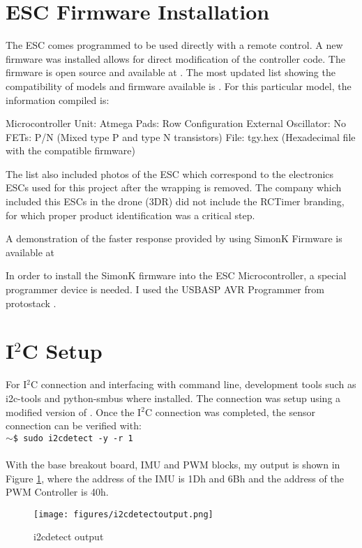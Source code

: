 \documentclass[letterpaper, 12pt]{article}
\newcommand{\shellcmd}[2]{\texttt{\large{#1}\$ {#2}\\}}
\begin{document}
\section{ESC Firmware Installation} \label{sec:simonk}

The ESC comes programmed to be used directly with a remote control. A new firmware was installed allows for direct modification of the controller code. The firmware is open source and available at \cite{simonk}. The most updated list showing the compatibility of models and firmware available is \cite{esc_list}. For this particular model, the information compiled is:

\noindent Microcontroller Unit: Atmega
Pads: Row Configuration
External Oscillator: No
FETs: P/N (Mixed type P and type N transistors)
File: tgy.hex (Hexadecimal file with the compatible firmware)

The list also included photos of the ESC which correspond to the electronics ESCs used for this project after the wrapping is removed. The company which included this ESCs in the drone (3DR) did not include the RCTimer branding, for which proper product identification was a critical step.

A demonstration of the faster response provided by using SimonK Firmware is available at \cite{simonk_demo}

In order to install the SimonK firmware into the ESC Microcontroller, a special programmer device is needed. I used the USBASP AVR Programmer from protostack \cite{avr_prog}.

\section{I$^2$C Setup}

For I$^2$C connection and interfacing with command line, development tools such as i2c-tools and python-smbus where installed. The connection was setup using a modified version of \cite{i2cpython}. Once the I$^2$C connection was completed,  the sensor connection can be verified with:\\

\shellcmd{\bf$\sim$}{sudo i2cdetect -y -r 1}\\

With the base breakout board, IMU and PWM blocks, my output is shown in Figure \ref{fig:i2cdetect_output}, where the address of the IMU is 1Dh and 6Bh and the address of the PWM Controller is 40h.\\
\begin{figure}[!htb]
    \centering
    \texttt{[image: figures/i2cdetectoutput.png]}
    \caption{i2cdetect output}
    \label{fig:i2cdetect_output} 
\end{figure}
\end{document}
